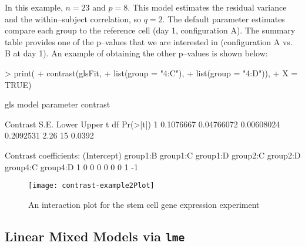 \documentclass[12pt]{article}
\newcommand{\code}[1]{\mbox{\footnotesize\color{darkblue}\texttt{#1}}}
\renewenvironment{Schunk}{\vspace{\topsep}}{\vspace{\topsep}}
\begin{document}
In this example, $n=23$ and $p=8$. This model estimates the residual variance and the within--subject correlation, so $q=2$. The default parameter estimates compare each group to the reference cell (day 1, configuration A). The summary table provides one of the p--values that we are interested in (configuration A vs. B at day 1). An example of obtaining the other p--values is shown below:
\begin{Schunk}
\begin{Sinput}
> print(
+       contrast(glsFit, 
+                list(group = "4:C"),
+                list(group = "4:D")),
+       X = TRUE)     
\end{Sinput}
\begin{Soutput}
gls model parameter contrast

   Contrast       S.E.      Lower     Upper    t df Pr(>|t|)
1 0.1076667 0.04766072 0.00608024 0.2092531 2.26 15   0.0392

Contrast coefficients:
  (Intercept) group1:B group1:C group1:D group2:C group2:D group4:C group4:D
1           0        0        0        0        0        0        1       -1
\end{Soutput}
\end{Schunk}


\begin{figure}[t]
   \begin{center}		
\texttt{[image: contrast-example2Plot]}
      \caption{An interaction plot for the stem cell gene expression experiment}
      \label{f:exp2}         
   \end{center}
\end{figure}
      


\subsection{Linear Mixed Models via \code{lme}}
\end{document}

